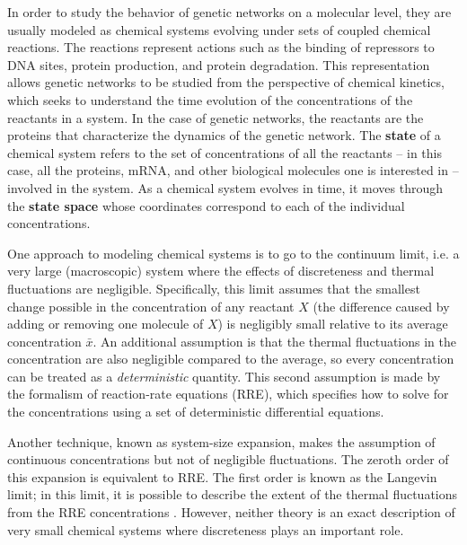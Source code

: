 \documentclass[english,letterpaper,12pt]{report}
\newcommand{\defkeywd}[1]{\textbf{#1}}
\begin{document}
\begin{doublespacing}
In order to study the behavior of genetic networks on a molecular level, they are usually modeled as chemical systems evolving under sets of coupled chemical reactions. The reactions represent actions such as the binding of repressors to DNA sites, protein production, and protein degradation. This representation allows genetic networks to be studied from the perspective of chemical kinetics, which seeks to understand the time evolution of the concentrations of the reactants in a system. In the case of genetic networks, the reactants are the proteins that characterize the dynamics of the genetic network. The \defkeywd{state} of a chemical system refers to the set of concentrations of all the reactants -- in this case, all the proteins, mRNA, and other biological molecules one is interested in -- involved in the system. As a chemical system evolves in time, it moves through the \defkeywd{state space} whose coordinates correspond to each of the individual concentrations.

One approach to modeling chemical systems is to go to the continuum limit, i.e. a very large (macroscopic) system where the effects of discreteness and thermal fluctuations are negligible. Specifically, this limit assumes that the smallest change possible in the concentration of any reactant $X$ (the difference caused by adding or removing one molecule of $X$) is negligibly small relative to its average concentration $\bar{x}$. An additional assumption is that the thermal fluctuations in the concentration are also negligible compared to the average, so every concentration can be treated as a \emph{deterministic} quantity. This second assumption is made by the formalism of reaction-rate equations (RRE), which specifies how to solve for the concentrations using a set of deterministic differential equations. 

Another technique, known as system-size expansion, makes the assumption of continuous concentrations but not of negligible fluctuations. The zeroth order of this expansion is equivalent to RRE. The first order is known as the Langevin limit; in this limit, it is possible to describe the extent of the thermal fluctuations from the RRE concentrations \cite{langevin-eqn}. However, neither theory is an exact description of very small chemical systems where discreteness plays an important role.


\end{doublespacing}
\end{document}
